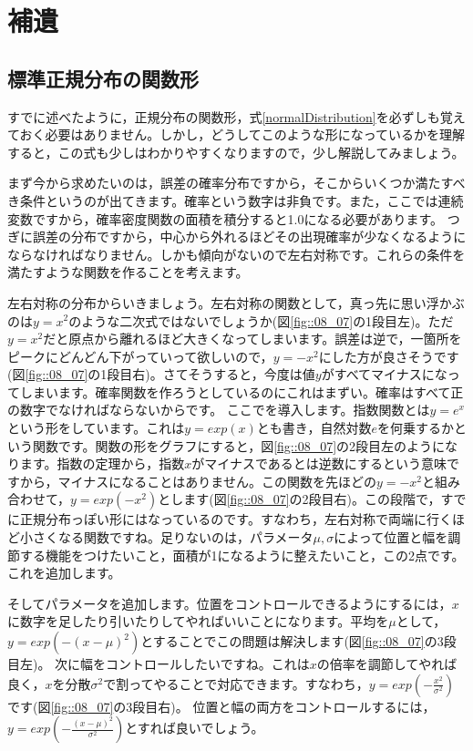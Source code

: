 \documentclass{ltjbook}
\begin{document}
\newpage
\section{補遺}
\subsection{標準正規分布の関数形}
すでに述べたように，正規分布の関数形，式\ref{normalDistribution}を必ずしも覚えておく必要はありません。しかし，どうしてこのような形になっているかを理解すると，この式も少しはわかりやすくなりますので，少し解説してみましょう。

まず今から求めたいのは，誤差の確率分布ですから，そこからいくつか満たすべき条件というのが出てきます。確率という数字は非負です。また，ここでは連続変数ですから，確率密度関数の面積を積分すると1.0になる必要があります。
つぎに誤差の分布ですから，中心から外れるほどその出現確率が少なくなるようにならなければなりません。しかも傾向がないので左右対称です。これらの条件を満たすような関数を作ることを考えます。

左右対称の分布からいきましょう。左右対称の関数として，真っ先に思い浮かぶのは$y=x^2$のような二次式ではないでしょうか(図\ref{fig::08_07}の1段目左)。ただ$y=x^2$だと原点から離れるほど大きくなってしまいます。誤差は逆で，一箇所をピークにどんどん下がっていって欲しいので，$y=-x^2$にした方が良さそうです(図\ref{fig::08_07}の1段目右)。さてそうすると，今度は値$y$がすべてマイナスになってしまいます。確率関数を作ろうとしているのにこれはまずい。確率はすべて正の数字でなければならないからです。
ここでを導入します。指数関数とは$y=e^x$という形をしています。これは$y=exp(x)$とも書き，自然対数$e$を何乗するかという関数です\footnotemark。関数の形をグラフにすると，図\ref{fig::08_07}の2段目左のようになります。指数の定理から，指数$x$がマイナスであるとは逆数にするという意味ですから，マイナスになることはありません\footnotemark。この関数を先ほどの$y=-x^2$と組み合わせて，$y=exp(-x^2)$とします(図\ref{fig::08_07}の2段目右)。この段階で，すでに正規分布っぽい形にはなっているのです。すなわち，左右対称で両端に行くほど小さくなる関数ですね。足りないのは，パラメータ$\mu,\sigma$によって位置と幅を調節する機能をつけたいこと，面積が1になるように整えたいこと，この2点です。これを追加します。

そしてパラメータを追加します。位置をコントロールできるようにするには，$x$に数字を足したり引いたりしてやればいいことになります。平均を$\mu$として，$y=exp(-(x-\mu)^2)$とすることでこの問題は解決します(図\ref{fig::08_07}の3段目左)。
次に幅をコントロールしたいですね。これは$x$の倍率を調節してやれば良く，$x$を分散$\sigma^2$で割ってやることで対応できます。すなわち，$y=exp(-\frac{x^2}{\sigma^2})$です(図\ref{fig::08_07}の3段目右)。
位置と幅の両方をコントロールするには，$y=exp(-\frac{(x-\mu)^2}{\sigma^2})$とすれば良いでしょう。
\end{document}
